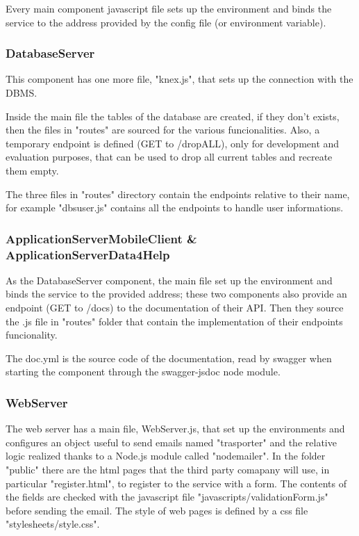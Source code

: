 \documentclass[../main.tex]{subfiles}
\begin{document}
Every main component javascript file sets up the environment and binds the service to the address provided by the config file (or environment variable).

\subsubsection{DatabaseServer}

This component has one more file, "knex.js", that sets up the connection with the DBMS.

Inside the main file the tables of the database are created, if they don't exists, then the files in "routes" are sourced for the various funcionalities. Also, a temporary endpoint is defined (GET to /dropALL), only for development and evaluation purposes, that can be used to drop all current tables and recreate them empty.

The three files in "routes" directory contain the endpoints relative to their name, for example "dbs\textunderscore user.js" contains all the endpoints to handle user informations.

\subsubsection{ApplicationServerMobileClient \& ApplicationServerData4Help}

As the DatabaseServer component, the main file set up the environment and binds the service to the provided address; these two components also provide an endpoint (GET to /docs) to the documentation of their API. Then they source the .js file in "routes" folder that contain the implementation of their endpoints funcionality.

The doc.yml is the source code of the documentation, read by swagger when starting the component through the swagger-jsdoc node module.

\subsubsection{WebServer}

The web server has a main file, WebServer.js, that set up the environments and configures an object useful to send emails named "trasporter" and the relative logic realized thanks to a Node.js module called "nodemailer".
In the folder "public" there are the html pages that the third party comapany will use, in particular "register.html", to register to the service with a form. The contents of the fields are checked with the javascript file "javascripts/validationForm.js" before sending the email.
The style of web pages is defined by a css file "stylesheets/style.css".
\end{document}
